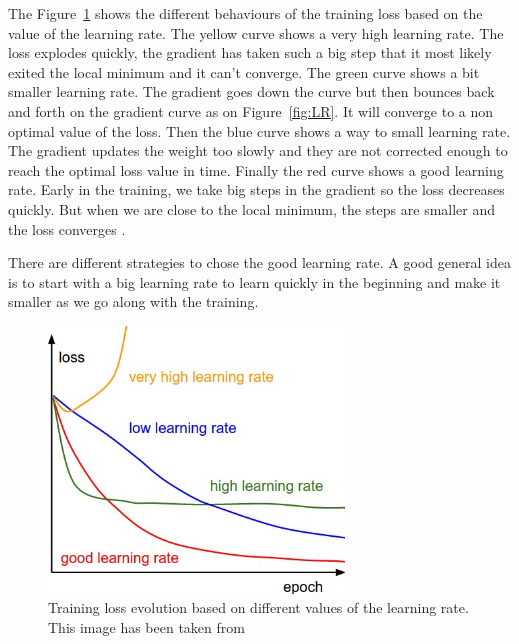 The Figure~\ref{fig:LR_impact} shows the different behaviours of the training loss based on the value of the learning rate. The yellow curve shows a very high learning rate. The loss explodes quickly, the gradient has taken such a big step that it most likely exited the local minimum and it can't converge. The green curve shows a bit smaller learning rate. The gradient goes down the curve but then bounces back and forth on the gradient curve as on Figure~\ref{fig:LR}. It will converge to a non optimal value of the loss. Then the blue curve shows a way to small learning rate. The gradient updates the weight too slowly and they are not corrected enough to reach the optimal loss value in time. Finally the red curve shows a good learning rate. Early in the training, we take big steps in the gradient so the loss decreases quickly. But when we are close to the local minimum, the steps are smaller and the loss converges \cite{lr}. 

There are different strategies to chose the good learning rate. A good general idea is to start with a big learning rate to learn quickly in the beginning and make it smaller as we go along with the training. 
\begin{figure}[!htp]
    \centering
        \includegraphics[width=0.7\textwidth]{figures/02-LR_impatc_train}
        \caption[Impact of the learning rate on training]{Training loss evolution based on different values of the learning rate. This image has been taken from \cite{cs231n}}\label{fig:LR_impact}
\end{figure}

